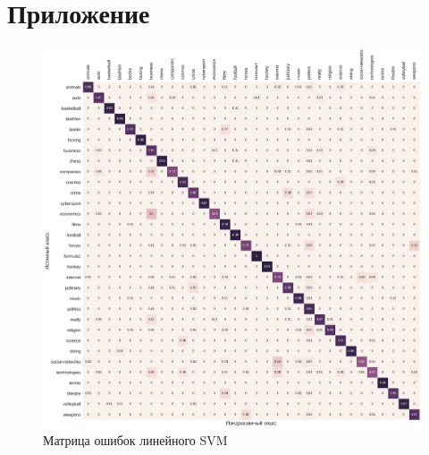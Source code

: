 \documentclass[a4paper, 14pt]{extarticle}
\begin{document}
\section{Приложение}
\begin{figure}[h!]
	\centering
	\includegraphics[width=1\textwidth]{svm_confusion_matrix.pdf}
	\caption{Матрица ошибок линейного SVM}
	\label{svm_confusion}
\end{figure}
\end{document}
